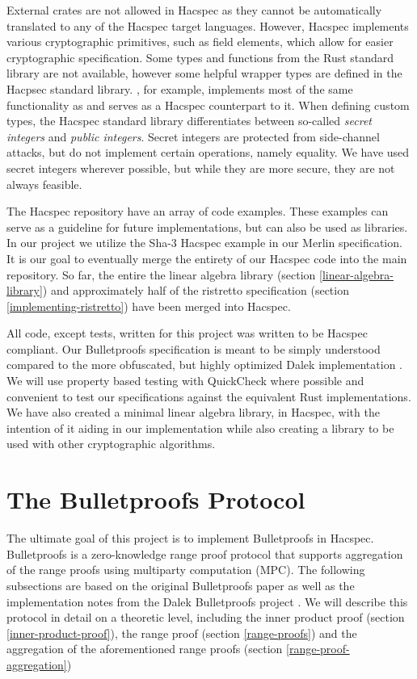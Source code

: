 \documentclass{article}
\newcommand*\ttvar[1]{\texttt{\expandafter\dottvar\detokenize{#1}\relax}}
\newcommand*\dottvar[1]{\ifx\relax#1\else
  \expandafter\ifx\string_#1\string_\allowbreak\else#1\fi
  \expandafter\dottvar\fi}
\begin{document}
External crates are not allowed in Hacspec as they cannot be
automatically translated to any of the Hacspec target languages.
However, Hacspec implements various cryptographic primitives, such as
field elements, which allow for easier cryptographic specification.
Some types and functions from the Rust standard library are not
available, however some helpful wrapper types are defined in the
Hacpsec standard library. \ttvar{Seq<T>}, for example, implements most
of the same functionality as \ttvar{Vec<T>} and serves as a Hacspec
counterpart to it. When defining custom types, the Hacspec standard
library differentiates between so-called \textit{secret integers}
and \textit{public integers}.  Secret integers are protected from
side-channel attacks, but do not implement certain operations, namely
equality. We have used secret integers wherever possible, but while
they are more secure, they are not always feasible.

The Hacspec repository have an array of code examples. These examples
can serve as a guideline for future implementations, but can also
be used as libraries. In our project we utilize the Sha-3 Hacspec
example in our Merlin specification. It is our goal to eventually merge 
the entirety of our Hacspec code into the main repository. So far, the
entire the linear algebra library (section \ref{linear-algebra-library})
and approximately half of the ristretto specification (section
\ref{implementing-ristretto}) have been merged into Hacspec.

All code, except tests, written for this project was written to be
Hacspec compliant. Our Bulletproofs specification is meant to be simply
understood compared to the more obfuscated, but highly optimized Dalek
implementation \cite{dalek}. We will use property based testing with
QuickCheck \cite{quickcheck} where possible and convenient to test
our specifications against the equivalent Rust implementations. We
have also created a minimal linear algebra library, in Hacspec, with
the intention of it aiding in our implementation while also creating
a library to be used with other cryptographic algorithms.

\section{The Bulletproofs Protocol} \label{bulletproofs}

The ultimate goal of this project is to implement Bulletproofs in
Hacspec. Bulletproofs is a zero-knowledge range proof protocol that
supports aggregation of the range proofs using multiparty computation
(MPC). The following subsections are based on the original Bulletproofs
paper \cite{bulletproofs} as well as the implementation notes from the
Dalek Bulletproofs project \cite{dalek-notes}. We will describe this
protocol in detail on a theoretic level, including the inner product
proof (section \ref{inner-product-proof}), the range proof (section
\ref{range-proofs}) and the aggregation of the aforementioned range
proofs (section \ref{range-proof-aggregation})
\end{document}
